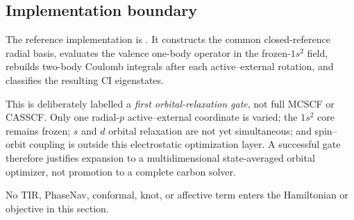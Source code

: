 \subsection{Implementation boundary}
The reference implementation is .  It constructs the common closed-reference radial basis, evaluates the valence one-body operator in the frozen-$1s^2$ field, rebuilds two-body Coulomb integrals after each active--external rotation, and classifies the resulting CI eigenstates.

This is deliberately labelled a \emph{first orbital-relaxation gate}, not full MCSCF or CASSCF.  Only one radial-$p$ active--external coordinate is varied; the $1s^2$ core remains frozen; $s$ and $d$ orbital relaxation are not yet simultaneous; and spin--orbit coupling is outside this electrostatic optimization layer.  A successful gate therefore justifies expansion to a multidimensional state-averaged orbital optimizer, not promotion to a complete carbon solver.

No TIR, PhaseNav, conformal, knot, or affective term enters the Hamiltonian or objective in this section.
